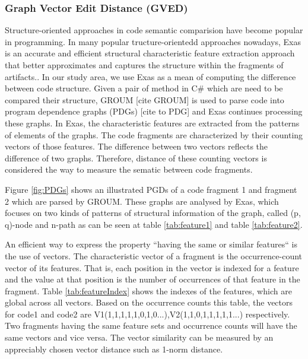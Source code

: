\subsubsection{\textbf{Graph Vector Edit Distance (GVED)}} 
Structure-oriented approaches in code semantic comparision have become popular in programming. In many popular tructure-orientedd approaches nowadays, Exas is an accurate and efficient structural characteristic feature extraction approach that better approximates and captures the structure within the fragments of artifacts.\cite{Accurate and Efficient Structural Characteristic Feature Extraction for Clone Detection}.
In our study area, we use Exas as a mean of computing the difference between code structure. Given a pair of method in C\# which are need to be compared their structure, GROUM [cite GROUM] is used to parse code into program dependence graphs (PDGs) [cite to PDG] and Exas continues processing these graphs. In Exas, the characteristic features are extracted from the patterns of elements of the graphs. The code fragments are characterized by their counting vectors of those features. The difference between two vectors reflects the difference of two graphs.  Therefore, distance of these counting vectors is considered the way to measure the sematic between code fragments.



Figure \ref{fig:PDGs} shows an illustrated PGDs of a code fragment 1 and fragment 2 which are parsed by GROUM. These graphs are analysed by Exas, which focuses on two kinds of patterns of structural information of the graph, called (p, q)-node and n-path as can be seen at table \ref{tab:feature1} and table \ref{tab:feature2}. 

An efficient way to express the property ``having the same or similar features`` is the use of vectors. The characteristic vector of a fragment is the occurrence-count vector of its features. That is, each position in the vector is indexed for a feature and the value at that position is the number of occurrences of that feature in the fragment. Table \ref{tab:featureIndex} shows the indexes of the features, which are global across all vectors. Based on the occurrence counts this table, the vectors for code1 and code2 are V1(1,1,1,1,1,0,1,0...),V2(1,1,0,1,1,1,1,1...) respectively. Two fragments having the same feature sets and occurrence counts will have the same vectors and vice versa. The vector similarity can be measured by an appreciably chosen vector distance such as 1-norm distance.

